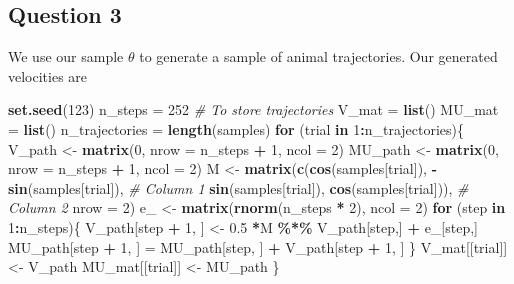 \documentclass[12pt,halfline,a4paper,]{ouparticle}
\newenvironment{Shaded}{\begin{snugshade}}{\end{snugshade}}
\newcommand{\AttributeTok}[1]{\textcolor[rgb]{0.13,0.29,0.53}{#1}}
\newcommand{\CommentTok}[1]{\textcolor[rgb]{0.56,0.35,0.01}{\textit{#1}}}
\newcommand{\ControlFlowTok}[1]{\textcolor[rgb]{0.13,0.29,0.53}{\textbf{#1}}}
\newcommand{\DecValTok}[1]{\textcolor[rgb]{0.00,0.00,0.81}{#1}}
\newcommand{\FloatTok}[1]{\textcolor[rgb]{0.00,0.00,0.81}{#1}}
\newcommand{\FunctionTok}[1]{\textcolor[rgb]{0.13,0.29,0.53}{\textbf{#1}}}
\newcommand{\NormalTok}[1]{#1}
\newcommand{\OtherTok}[1]{\textcolor[rgb]{0.56,0.35,0.01}{#1}}
\newcommand{\SpecialCharTok}[1]{\textcolor[rgb]{0.81,0.36,0.00}{\textbf{#1}}}
\begin{document}
\subsection{Question 3}\label{question-3}

We use our sample \(\mathbb{\theta}\) to generate a sample of animal
trajectories. Our generated velocities are

\begin{Shaded}
\begin{Highlighting}[]
\FunctionTok{set.seed}\NormalTok{(}\DecValTok{123}\NormalTok{)}
\NormalTok{n\_steps }\OtherTok{=} \DecValTok{252}
\CommentTok{\# To store trajectories}
\NormalTok{V\_mat }\OtherTok{=} \FunctionTok{list}\NormalTok{()}
\NormalTok{MU\_mat }\OtherTok{=} \FunctionTok{list}\NormalTok{()}
\NormalTok{n\_trajectories }\OtherTok{=} \FunctionTok{length}\NormalTok{(samples)}
\ControlFlowTok{for}\NormalTok{ (trial }\ControlFlowTok{in} \DecValTok{1}\SpecialCharTok{:}\NormalTok{n\_trajectories)\{}
\NormalTok{  V\_path }\OtherTok{\textless{}{-}} \FunctionTok{matrix}\NormalTok{(}\DecValTok{0}\NormalTok{, }\AttributeTok{nrow =}\NormalTok{ n\_steps }\SpecialCharTok{+} \DecValTok{1}\NormalTok{, }\AttributeTok{ncol =} \DecValTok{2}\NormalTok{)}
\NormalTok{  MU\_path }\OtherTok{\textless{}{-}} \FunctionTok{matrix}\NormalTok{(}\DecValTok{0}\NormalTok{, }\AttributeTok{nrow =}\NormalTok{ n\_steps }\SpecialCharTok{+} \DecValTok{1}\NormalTok{, }\AttributeTok{ncol =} \DecValTok{2}\NormalTok{)}
\NormalTok{  M }\OtherTok{\textless{}{-}} \FunctionTok{matrix}\NormalTok{(}\FunctionTok{c}\NormalTok{(}\FunctionTok{cos}\NormalTok{(samples[trial]), }\SpecialCharTok{{-}}\FunctionTok{sin}\NormalTok{(samples[trial]),  }\CommentTok{\# Column 1}
                \FunctionTok{sin}\NormalTok{(samples[trial]),  }\FunctionTok{cos}\NormalTok{(samples[trial])),  }\CommentTok{\# Column 2}
              \AttributeTok{nrow =} \DecValTok{2}\NormalTok{)}
\NormalTok{  e\_ }\OtherTok{\textless{}{-}} \FunctionTok{matrix}\NormalTok{(}\FunctionTok{rnorm}\NormalTok{(n\_steps }\SpecialCharTok{*} \DecValTok{2}\NormalTok{), }\AttributeTok{ncol =} \DecValTok{2}\NormalTok{)}
  \ControlFlowTok{for}\NormalTok{ (step }\ControlFlowTok{in} \DecValTok{1}\SpecialCharTok{:}\NormalTok{n\_steps)\{}
\NormalTok{    V\_path[step }\SpecialCharTok{+} \DecValTok{1}\NormalTok{, ] }\OtherTok{\textless{}{-}}  \FloatTok{0.5} \SpecialCharTok{*}\NormalTok{M }\SpecialCharTok{\%*\%}\NormalTok{ V\_path[step,] }\SpecialCharTok{+}\NormalTok{ e\_[step,]}
\NormalTok{    MU\_path[step }\SpecialCharTok{+} \DecValTok{1}\NormalTok{, ] }\OtherTok{=}\NormalTok{ MU\_path[step, ] }\SpecialCharTok{+}\NormalTok{ V\_path[step }\SpecialCharTok{+} \DecValTok{1}\NormalTok{, ]}
\NormalTok{  \}}
\NormalTok{  V\_mat[[trial]] }\OtherTok{\textless{}{-}}\NormalTok{ V\_path}
\NormalTok{  MU\_mat[[trial]] }\OtherTok{\textless{}{-}}\NormalTok{ MU\_path}
\NormalTok{\}}


\end{Highlighting}
\end{Shaded}
\end{document}
